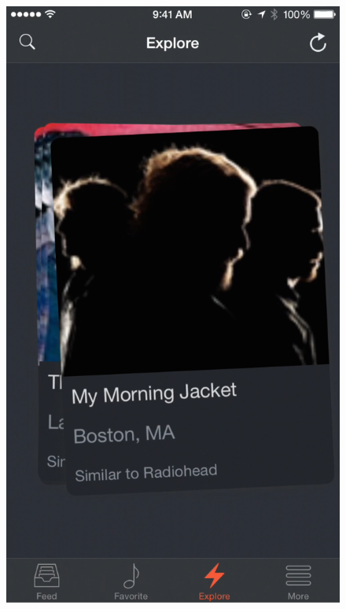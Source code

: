 \begin{figure}
\begin{minipage}{.5\textwidth}
        		\includegraphics[width=.7\linewidth]{./pics/app6.png}
        	\end{minipage}
        \end{figure}		

